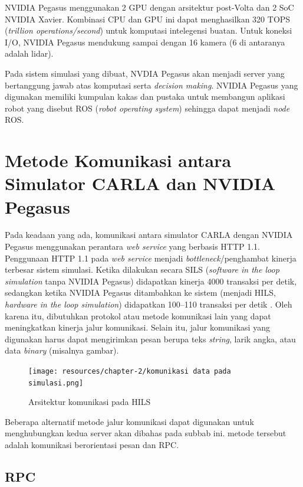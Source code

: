 NVIDIA Pegasus menggunakan 2 GPU dengan arsitektur post-Volta dan 2 SoC NVIDIA
Xavier. Kombinasi CPU dan GPU ini dapat menghasilkan 320 TOPS (\textit{trillion
    operations/second}) untuk komputasi intelegensi buatan. Untuk koneksi I/O,
NVIDIA Pegasus mendukung sampai dengan 16 kamera (6 di antaranya adalah lidar).

Pada sistem simulasi yang dibuat, NVDIA Pegasus akan menjadi server yang
ber\-tang\-gung jawab atas komputasi serta \textit{decision making}. NVIDIA
Pegasus yang digunakan memiliki kumpulan kakas dan pustaka untuk membangun
aplikasi robot yang disebut ROS (\textit{robot operating system}) sehingga dapat
menjadi \textit{node} ROS.

\section{Metode Komunikasi antara Simulator CARLA dan NVI\-DI\-A Pegasus}

Pada keadaan yang ada, komunikasi antara simulator CARLA dengan NVIDIA Pegasus
menggunakan perantara \textit{web service} yang berbasis HTTP 1.1. Penggunaan
HTTP 1.1 pada \textit{web service} menjadi \textit{bottleneck}/penghambat
kinerja terbesar sistem simulasi. Ketika dilakukan secara SILS (\textit{software
    in the loop simulation} tanpa NVIDIA Pegasus) didapatkan kinerja 4000 transaksi
per detik, sedangkan ketika NVIDIA Pegasus ditambahkan ke sistem (menjadi HILS,
\textit{hardware in the loop simulation}) didapatkan 100--110 transaksi per
detik \parencite{trilaksono_laporanRispro}. Oleh karena itu, dibutuhkan protokol
atau metode komunikasi lain yang dapat meningkatkan kinerja jalur komunikasi.
Selain itu, jalur komunikasi yang digunakan harus dapat mengirimkan pesan berupa
teks \textit{string}, larik angka, atau data \textit{binary} (misalnya gambar).

\begin{figure}
    \centering
    \texttt{[image: resources/chapter-2/komunikasi
        data pada simulasi.png]}
    \caption{Arsitektur komunikasi pada HILS
        \parencite{trilaksono_laporanRispro}}
\end{figure}

Beberapa alternatif metode jalur komunikasi dapat digunakan untuk
meng\-hu\-bung\-kan kedua server akan dibahas pada subbab ini. metode tersebut
adalah komunikasi berorientasi pesan dan RPC.

\subsection{RPC}

